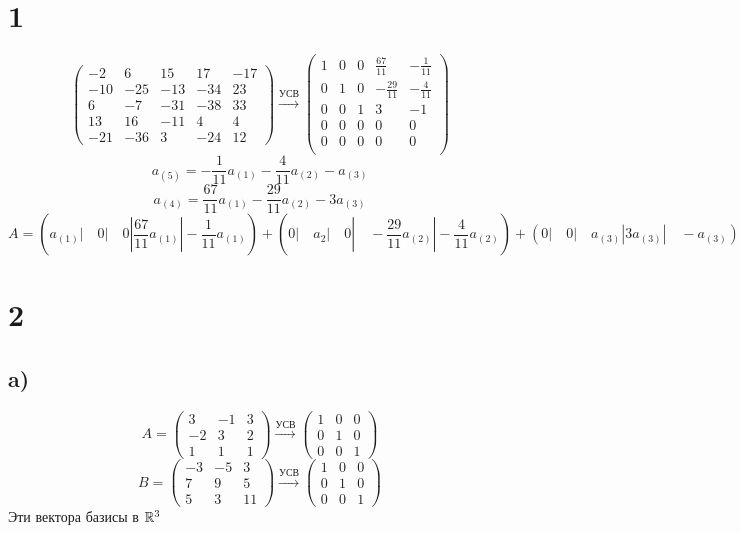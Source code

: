 

	\section*{1}
	$$\begin{pmatrix}
		-2 & 6 & 15 & 17 & -17\\
		-10 & -25 & -13 & -34 & 23 \\
		6 & -7 & -31 & -38& 33 \\
		13 & 16& -11 & 4 & 4 \\
		-21 & -36 & 3 & -24 & 12 
	\end{pmatrix}\xrightarrow{\text{УСВ}}
	\begin{pmatrix}
1 & 0 & 0 & \frac{67}{11} & -\frac{1}{11} \\
	0 & 1 & 0 & -\frac{29}{11} & -\frac{4}{11}\\
	0 & 	0 & 1 & 3 & -1 \\
	0 & 0 & 0 & 0 & 0\\
	0 & 0 & 0 & 0 & 0\\
	\end{pmatrix}$$
	$$a_{(5)} = -\frac{1}{11}a_{(1)} - \frac{4}{11}a_{(2)}-a_{(3)}$$
	$$a_{(4)} = \frac{67}{11}a_{(1)}- \frac{29}{11}a_{(2)}-3a_{(3)}$$
	$$A = \left(a_{(1)}|\quad 0 |\quad 0 |\frac{67}{11}a_{(1)} |-\frac{1}{11}a_{(1)} \right) + \left(0 |\quad a_{2}|\quad 0 |\quad -\frac{29}{11}a_{(2)}|- \frac{4}{11}a_{(2)} \right) + \left(0 |\quad 0 |\quad a_{(3)}| 3a_{(3)}| \quad -a_{(3)}\right)$$
	\section*{2}
	\subsection*{a)}
	$$A = \begin{pmatrix}
		3 & -1 & 3 \\
		-2 & 3 & 2 \\
		1 & 1 & 1
	\end{pmatrix}\xrightarrow{\text{УСВ}} \begin{pmatrix}
	1 & 0 & 0 \\
	0 & 1 & 0 \\
	0 & 0 & 1 
	\end{pmatrix}$$ 
	$$B =\begin{pmatrix}
		-3 & -5 & 3 \\
		7 & 9 & 5\\
		5 & 3 & 11 
	\end{pmatrix}\xrightarrow{\text{УСВ}} 
	\begin{pmatrix}
		1 & 0 & 0 \\
		0 & 1 & 0 \\
		0 & 0 & 1 
	\end{pmatrix}$$ 
	Эти вектора базисы в $\mathbb{R}^3$
